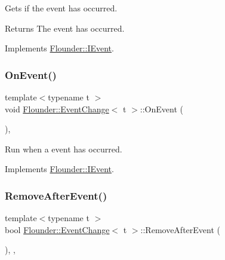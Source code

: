 Gets if the event has occurred. 

\begin{DoxyReturn}{Returns}
The event has occurred. 
\end{DoxyReturn}


Implements \hyperlink{class_flounder_1_1_i_event_a86004d7cbef85aa2f80e6def5dc107b3}{Flounder\+::\+I\+Event}.

\mbox{\label{class_flounder_1_1_event_change_a07f5769fc3e4c401e1f3929978f759fc}} 
\subsubsection{\texorpdfstring{On\+Event()}{OnEvent()}}
{\footnotesize\ttfamily template$<$typename t $>$ \\
void \hyperlink{class_flounder_1_1_event_change}{Flounder\+::\+Event\+Change}$<$ t $>$\+::On\+Event (\begin{DoxyParamCaption}{ }\end{DoxyParamCaption})\hspace{0.3cm}{\ttfamily [override]}, {\ttfamily [virtual]}}



Run when a event has occurred. 



Implements \hyperlink{class_flounder_1_1_i_event_a67f7265c6decfdf4d29b94a088f45501}{Flounder\+::\+I\+Event}.

\mbox{\label{class_flounder_1_1_event_change_ad13467a09f7a46260b52fae6bba11973}} 
\subsubsection{\texorpdfstring{Remove\+After\+Event()}{RemoveAfterEvent()}}
{\footnotesize\ttfamily template$<$typename t $>$ \\
bool \hyperlink{class_flounder_1_1_event_change}{Flounder\+::\+Event\+Change}$<$ t $>$\+::Remove\+After\+Event (\begin{DoxyParamCaption}{ }\end{DoxyParamCaption})\hspace{0.3cm}{\ttfamily [inline]}, {\ttfamily [override]}, {\ttfamily [virtual]}}



